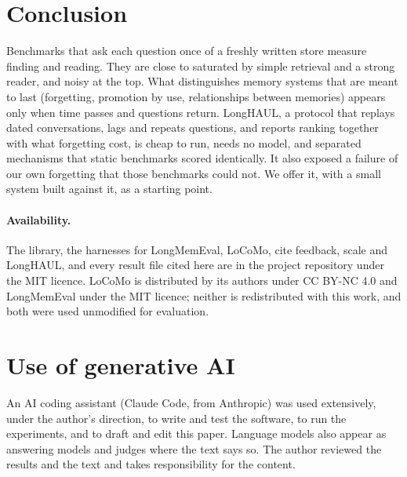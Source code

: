 \documentclass[11pt]{article}
\begin{document}
\section{Conclusion}

Benchmarks that ask each question once of a freshly written store
measure finding and reading. They are close to saturated by simple
retrieval and a strong reader, and noisy at the top. What distinguishes
memory systems that are meant to last (forgetting, promotion by use,
relationships between memories) appears only when time passes and
questions return. LongHAUL, a protocol that replays dated conversations, lags and
repeats questions, and reports ranking together with what forgetting
cost, is cheap to run, needs no model, and separated mechanisms that
static benchmarks scored identically. It also exposed a failure of
our own forgetting that those benchmarks could not. We offer it, with a small system
built against it, as a starting point.

\paragraph{Availability.} The library, the harnesses for LongMemEval,
LoCoMo, cite feedback, scale and LongHAUL, and every
result file cited here are in the project repository under the MIT
licence. LoCoMo \citep{maharana2024locomo} is distributed by its authors under
CC BY-NC 4.0 and LongMemEval \citep{wu2025longmemeval} under the MIT
licence; neither is redistributed with this work, and both were used
unmodified for evaluation.

\section*{Use of generative AI}

An AI coding assistant (Claude Code, from Anthropic) was used
extensively, under the author's direction, to write and test the
software, to run the experiments, and to draft and edit this paper.
Language models also appear as answering models and judges where the
text says so. The author reviewed the results and the text and takes
responsibility for the content.



\end{document}
